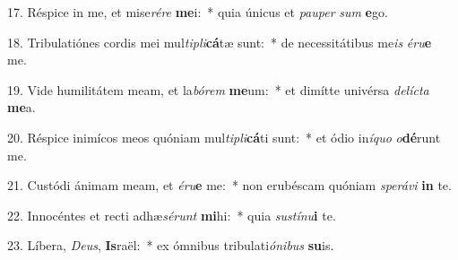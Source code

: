 17. Réspice in me, et mise\textit{ré}\textit{re} \textbf{me}i:~*  quia únicus et \textit{pau}\textit{per} \textit{sum} \textbf{e}go.\

18. Tribulatiónes cordis mei mul\textit{ti}\textit{pli}\textbf{cá}tæ sunt:~*  de necessitátibus me\textit{is} \textit{é}\textit{ru}\textbf{e} me.\

19. Vide humilitátem meam, et la\textit{bó}\textit{rem} \textbf{me}um:~*  et dimítte univérsa \textit{de}\textit{líc}\textit{ta} \textbf{me}a.\

20. Réspice inimícos meos quóniam mul\textit{ti}\textit{pli}\textbf{cá}ti sunt:~*  et ódio in\textit{í}\textit{quo} \textit{o}\textbf{dé}runt me.\

21. Custódi ánimam meam, et \textit{é}\textit{ru}\textbf{e} me:~*  non erubéscam quóniam \textit{spe}\textit{rá}\textit{vi} \textbf{in} te.\

22. Innocéntes et recti adhæ\textit{sé}\textit{runt} \textbf{mi}hi:~*  quia \textit{sus}\textit{tí}\textit{nu}\textbf{i} te.\

23. Líbera, \textit{De}\textit{us}, \textbf{Is}raël:~*  ex ómnibus tribulati\textit{ó}\textit{ni}\textit{bus} \textbf{su}is.\

